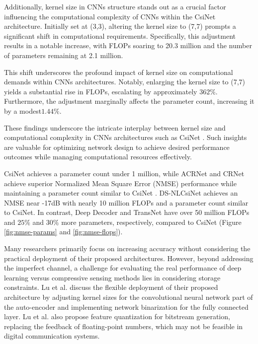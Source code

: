 \documentclass[lettersize,journal]{IEEEtran}
\begin{document}
Additionally, kernel size in CNNs structure stands out as a crucial factor influencing the computational complexity of CNNs  within the CsiNet \cite{abe} architecture. Initially set at (3,3), altering the kernel size to (7,7) prompts a significant shift in computational requirements. Specifically, this adjustment results in a notable increase, with FLOPs soaring to 20.3 million and the number of parameters remaining at 2.1 million.

This shift underscores the profound impact of kernel size on computational demands within CNNs architectures. Notably, enlarging the kernel size to (7,7) yields a substantial rise in FLOPs, escalating by approximately 
\begin{math}362\%\end{math}. Furthermore, the adjustment marginally affects the parameter count, increasing it by a modest\begin{math}1.44\%\end{math}.

These findings underscore the intricate interplay between kernel size and computational complexity in CNNs architectures such as CsiNet \cite{abe}. Such insights are valuable for optimizing network design to achieve desired performance outcomes while managing computational resources effectively.

CsiNet \cite{abe} achieves a parameter count under 1 million, while ACRNet \cite{abx} and CRNet \cite{abn} achieve superior Normalized Mean Square Error (NMSE) performance while maintaining a parameter count similar to CsiNet \cite{abe}. DS-NLCsiNet \cite{abq} achieves an NMSE near -17dB with nearly 10 million FLOPs and a parameter count similar to CsiNet. In contrast, Deep Decoder \cite{aby} and TransNet \cite{abz} have over 50 million FLOPs and \begin{math} 25\%\end{math} and \begin{math} 30\%\end{math} more parameters, respectively, compared to CsiNet (Figure \ref{fig:nmse-params} and \ref{fig:nmse-flops}).

Many researchers primarily focus on increasing accuracy without considering the practical deployment of their proposed architectures. However, beyond addressing the imperfect channel, a challenge for evaluating the real performance of deep learning versus compressive sensing methods lies in considering storage constraints. Lu et al. \cite{abp} discuss the flexible deployment of their proposed architecture by adjusting kernel sizes for the convolutional neural network part of the auto-encoder and implementing network binarization for the fully connected layer. Lu et al. \cite{abp} also propose feature quantization for bitstream generation, replacing the feedback of floating-point numbers, which may not be feasible in digital communication systems.
\end{document}
